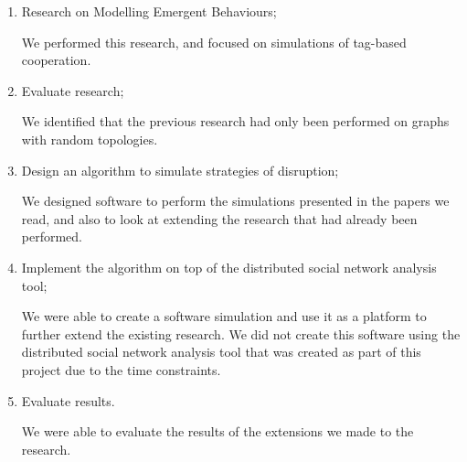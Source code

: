 \begin{enumerate}
	\item Research on Modelling Emergent Behaviours;
	
	We performed this research, and focused on simulations of tag-based cooperation.
	
	\item Evaluate research;
	
	We identified that the previous research had only been performed on graphs with random topologies.
	
	\item Design an algorithm to simulate strategies of disruption;
	
	We designed software to perform the simulations presented in the papers we read, and also to look at extending the research that had already been performed.
	
	\item Implement the algorithm on top of the distributed social network analysis tool;
	
	We were able to create a software simulation and use it as a platform to further extend the existing research.
	We did not create this software using the distributed social network analysis tool that was created as part of this project due to the time constraints.
	
	\item Evaluate results.
	
	We were able to evaluate the results of the extensions we made to the research.
\end{enumerate}